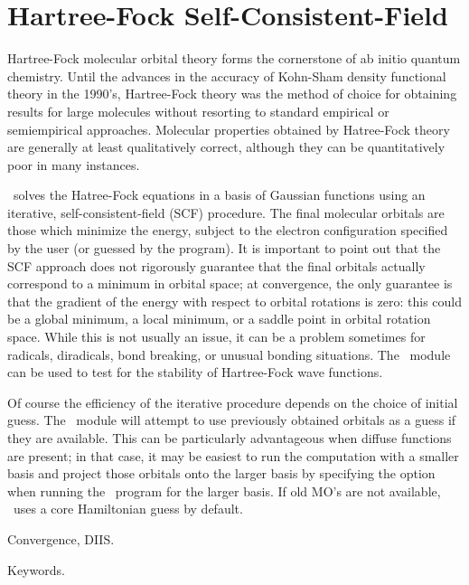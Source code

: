 \section{Hartree-Fock Self-Consistent-Field} \label{scf}
                                                                                
Hartree-Fock molecular orbital theory forms the cornerstone of
ab initio quantum chemistry.  Until the advances in the accuracy
of Kohn-Sham density functional theory in the 1990's, Hartree-Fock
theory was the method of choice for obtaining results for large
molecules without resorting to standard empirical or semiempirical
approaches.  Molecular properties obtained by Hatree-Fock theory are
generally at least qualitatively correct, although they can be
quantitatively poor in many instances.
                                                                                
\PSIthree\ solves the Hatree-Fock equations in a basis of Gaussian 
functions using an iterative, self-consistent-field (SCF) procedure.  The
final molecular orbitals are those which minimize the energy, 
subject to the electron configuration specified by the user (or
guessed by the program).  It is important to point out that the
SCF approach does not rigorously guarantee that the final orbitals
actually correspond to a minimum in orbital space; at convergence,
the only guarantee is that the gradient of the energy with respect 
to orbital rotations is zero: this could be a global minimum, a local
minimum, or a saddle point in orbital rotation space.  While this
is not usually an issue, it can be a problem sometimes for radicals,
diradicals, bond breaking, or unusual bonding situations.  The
\PSIstable\ module can be used to test for the stability of Hartree-Fock
wave functions.

Of course the efficiency of the iterative procedure depends on the choice of
initial guess.  The \PSIcscf\ module will attempt to use previously obtained
orbitals as a guess if they are available.  This can be particularly
advantageous when diffuse functions are present; in that case, it may
be easiest to run the computation with a smaller basis and project
those orbitals onto the larger basis by specifying the 
option when running the \PSIinput\ program for the larger basis.  If
old MO's are not available, \PSIcscf\ uses a core Hamiltonian guess
by default.

Convergence, DIIS.

Keywords.



